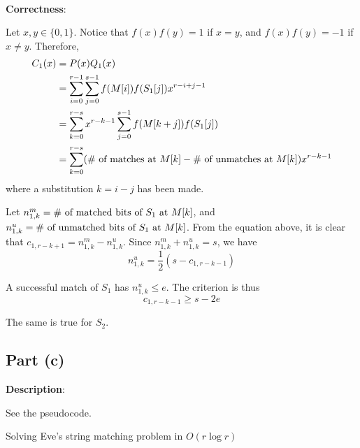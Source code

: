 \documentclass{article}
\begin{document}
~

\noindent\textbf{Correctness}:

Let $x,y\in\{0,1\}$. Notice that $f(x)f(y)=1$ if $x=y$, and $f(x)f(y)=-1$ if $x\neq y$. Therefore,
\begin{align*}
C_1(x)&=P(x)Q_1(x)\\
&=\sum_{i=0}^{r-1}\sum_{j=0}^{s-1}f(M[i])f(S_1[j])x^{r-i+j-1}\\
&=\sum_{k=0}^{r-s}x^{r-k-1}\sum_{j=0}^{s-1}f(M[k+j])f(S_1[j])\\
&=\sum_{k=0}^{r-s}(\textup{\# of matches at $M[k]$}-\textup{\# of unmatches at $M[k]$})x^{r-k-1}
\end{align*}
where a substitution $k=i-j$ has been made.

Let $n^m_{1,k}=\textup{\# of matched bits of $S_1$ at $M[k]$}$, and $n^u_{1,k}=\textup{\# of unmatched bits of $S_1$ at $M[k]$}$. From the equation above, it is clear that $c_{1,r-k+1}=n^m_{1,k}-n^u_{1,k}$. Since $n^m_{1,k}+n^u_{1,k}=s$, we have
\begin{equation*}
n^u_{1,k}=\frac{1}{2}(s-c_{1,r-k-1})
\end{equation*}

A successful match of $S_1$ has $n^u_{1,k}\leqslant e$. The criterion is thus
\begin{equation*}
c_{1,r-k-1}\geqslant s-2e
\end{equation*}

The same is true for $S_2$.

\subsection{Part (c)}
\noindent\textbf{Description}:

See the pseudocode.
\begin{algorithm}
\caption{Solving Eve's string matching problem in $O(r\log r)$}
\begin{algorithmic}[1]
	\EndIf
	\EndIf
\EndFor
{}
\Else{}
\EndIf
\EndProcedure
\end{algorithmic}
\end{algorithm}
\end{document}
